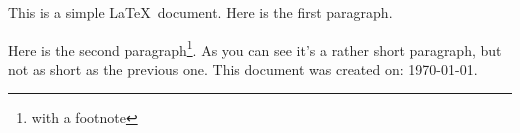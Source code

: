 \documentclass[12pt]{scrartcl}
\begin{document}
This is a simple \LaTeX\ document.
Here is the first paragraph.

Here is the second paragraph\footnote{with a footnote}. 
As you can see it's a rather short paragraph, but not 
as short as the previous one. This document was 
created on: \today.
\end{document}
